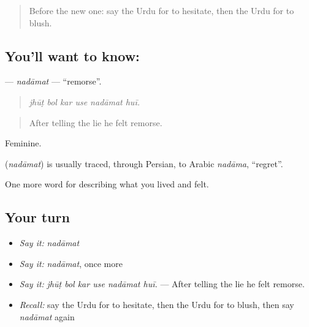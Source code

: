 \label{lesson:UR-C451-nadamat}



\begin{quote}
Before the new one: say the Urdu for to hesitate, then the Urdu for to blush.
\end{quote}

\subsection*{You'll want to know: }
\textbf{} — \emph{nadāmat} — \textquotedblleft{}remorse\textquotedblright{}.

\begin{quote}
     
\end{quote}

\begin{quote}
\emph{jhūṭ bol kar use nadāmat huī.}
\end{quote}

\begin{quote}
After telling the lie he felt remorse.
\end{quote}

Feminine.

\begin{cousinweb}
\textbf{} (\emph{nadāmat}) is usually traced, through Persian, to Arabic \emph{nadāma}, \textquotedblleft{}regret\textquotedblright{}.
\end{cousinweb}

\begin{grammarlens}[title={What you've built}]
One more word for describing what you lived and felt.
\end{grammarlens}

\subsection*{Your turn}
\begin{itemize}
\raggedright
  \item \emph{Say it:} \emph{nadāmat}
  \item \emph{Say it:} \emph{nadāmat}, once more
  \item \emph{Say it:} \emph{jhūṭ bol kar use nadāmat huī.} — After telling the lie he felt remorse.
  \item \emph{Recall:} say the Urdu for to hesitate, then the Urdu for to blush, then say \emph{nadāmat} again
\end{itemize}

